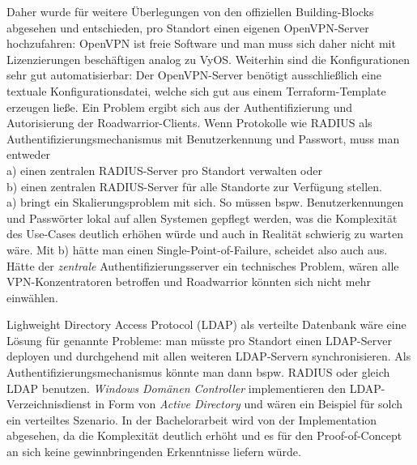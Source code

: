 Daher wurde für weitere Überlegungen von den offiziellen Building-Blocks abgesehen und entschieden, pro Standort einen eigenen OpenVPN-Server hochzufahren:
OpenVPN ist freie Software und man muss sich daher nicht mit Lizenzierungen beschäftigen analog zu VyOS. Weiterhin sind die Konfigurationen sehr gut automatisierbar: Der OpenVPN-Server benötigt ausschließlich eine textuale Konfigurationsdatei, welche sich gut aus einem Terraform-Template erzeugen ließe.
Ein Problem ergibt sich aus der Authentifizierung und Autorisierung der Roadwarrior-Clients. Wenn Protokolle wie RADIUS als Authentifizierungsmechanismus mit Benutzerkennung und Passwort, muss man entweder\\
a) einen zentralen RADIUS-Server pro Standort verwalten oder \\
b) einen zentralen RADIUS-Server für alle Standorte zur Verfügung stellen.\\

a) bringt ein Skalierungsproblem mit sich. So müssen bspw. Benutzerkennungen und Passwörter lokal auf allen Systemen gepflegt werden, was die Komplexität des Use-Cases deutlich erhöhen würde und auch in Realität schwierig zu warten wäre. Mit b) hätte man einen Single-Point-of-Failure, scheidet also auch aus. Hätte der \textit{zentrale} Authentifizierungsserver ein technisches Problem, wären alle VPN-Konzentratoren betroffen und Roadwarrior könnten sich nicht mehr einwählen.

Lighweight Directory Access Protocol (LDAP) als verteilte Datenbank wäre eine Lösung für genannte Probleme: man müsste pro Standort einen LDAP-Server deployen und durchgehend mit allen weiteren LDAP-Servern synchronisieren. Als Authentifizierungsmechanismus könnte man dann bspw. RADIUS oder gleich LDAP benutzen. \textit{Windows Domänen Controller} implementieren den LDAP-Verzeichnisdienst in Form von \textit{Active Directory} und wären ein Beispiel für solch ein verteiltes Szenario.\cite[S.603-604]{Tanenbaum2003} In der Bachelorarbeit wird von der Implementation abgesehen, da die Komplexität deutlich erhöht und es für den Proof-of-Concept an sich keine gewinnbringenden Erkenntnisse liefern würde.

